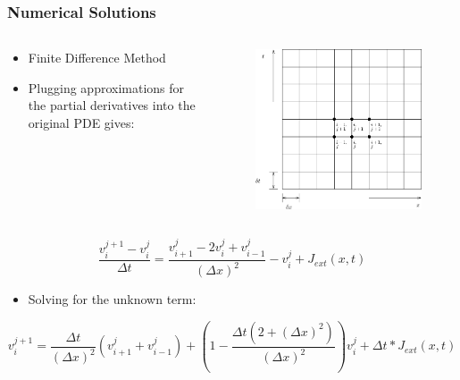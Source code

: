 \documentclass{beamer}
\begin{document}
\begin{frame}
\frametitle{Numerical Solutions}
\begin{columns}


\begin{column}{.6\textwidth}
\begin{itemize}
	\item{Finite Difference Method}
	\item{Plugging approximations for the partial derivatives into the original PDE gives:}
\end{itemize}
\end{column}
\begin{column}{.4\textwidth}
\begin{figure}[H]
  \includegraphics[width=\linewidth]{grid.png}
  \label{fig:sketch2}
\end{figure}
\end{column}
\end{columns}
\[\frac{v^{j+1}_i-v^j_i}{\Delta{t}}=\frac{v^{j}_{i+1}-2v^j_i+v^j_{i-1}}{(\Delta{x})^2}-v^j_i+J_{ext}(x,t)\]
\begin{itemize}
	\item{Solving for the unknown term:}
\end{itemize}
\[v^{j+1}_i=\frac{\Delta{t}}{(\Delta{x})^2}(v^{j}_{i+1}+v^{j}_{i-1})+(1-\frac{\Delta{t}(2+(\Delta{x})^2)}{(\Delta{x})^2})v^{j}_{i}+\Delta{t}*J_{ext}(x,t)\]
\end{frame}
\end{document}
